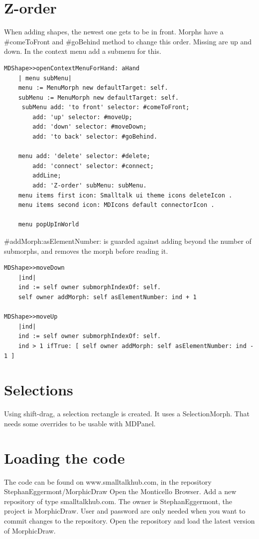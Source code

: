 \documentclass[10pt, twoside]{article}   	%
\begin{document}
\section{Z-order}
When adding shapes, the newest one gets to be in front. Morphs have a \#comeToFront
and \#goBehind method to change this order. Missing are up and down.
In the context menu add a submenu for this.
\begin{verbatim}
MDShape>>openContextMenuForHand: aHand
    | menu subMenu|
    menu := MenuMorph new defaultTarget: self.
    subMenu := MenuMorph new defaultTarget: self.
     subMenu add: 'to front' selector: #comeToFront;
        add: 'up' selector: #moveUp;
        add: 'down' selector: #moveDown;
        add: 'to back' selector: #goBehind.
	
    menu add: 'delete' selector: #delete;
        add: 'connect' selector: #connect;
        addLine;
        add: 'Z-order' subMenu: subMenu.
    menu items first icon: Smalltalk ui theme icons deleteIcon .
    menu items second icon: MDIcons default connectorIcon .

    menu popUpInWorld
\end{verbatim}

\#addMorph:asElementNumber: is guarded against adding beyond the number of 
submorphs, and removes the morph before reading it.
\begin{verbatim}
MDShape>>moveDown
    |ind|
    ind := self owner submorphIndexOf: self.
    self owner addMorph: self asElementNumber: ind + 1 

MDShape>>moveUp
    |ind|
    ind := self owner submorphIndexOf: self.
    ind > 1 ifTrue: [ self owner addMorph: self asElementNumber: ind - 1 ]
\end{verbatim}
\section{Selections}
Using shift-drag, a selection rectangle is created. It uses a SelectionMorph.
That needs some overrides to be usable with MDPanel. 

\section{Loading the code}
The code can be found on www.smalltalkhub.com, in the repository StephanEggermont/MorphicDraw
Open the Monticello Browser. Add a new repository of type smalltalkhub.com. 
The owner is StephanEggermont, the project is MorphicDraw. User and password are only needed
when you want to commit changes to the repository. Open the repository and load the latest version of
MorphicDraw.
\end{document}
